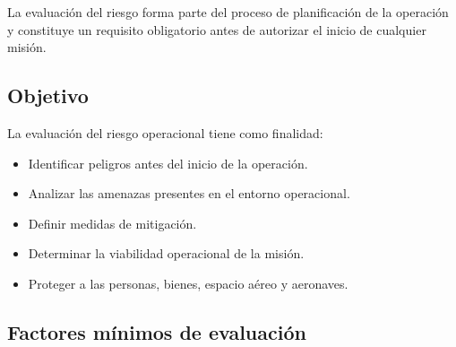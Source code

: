 La evaluación del riesgo forma parte del proceso de planificación de la operación y constituye un requisito obligatorio antes de autorizar el inicio de cualquier misión.


\subsection{Objetivo}

La evaluación del riesgo operacional tiene como finalidad:

\begin{itemize}

\item Identificar peligros antes del inicio de la operación.

\item Analizar las amenazas presentes en el entorno operacional.

\item Definir medidas de mitigación.

\item Determinar la viabilidad operacional de la misión.

\item Proteger a las personas, bienes, espacio aéreo y aeronaves.

\end{itemize}

\subsection{Factores mínimos de evaluación}

\renewcommand{\arraystretch}{1.3}


